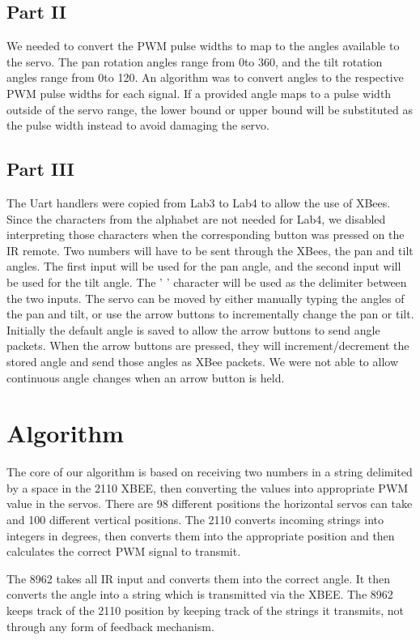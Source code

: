 \documentclass[11pt, titlepage]{article}
\begin{document}
        \subsection{Part II}
            We needed to convert the PWM pulse widths to map to the angles available to the servo. The pan rotation angles range from 0\degree to 360\degree, and the tilt rotation angles range from 0\degree to 120\degree. An algorithm was to convert angles to the respective PWM pulse widths for each signal. If a provided angle maps to a pulse width outside of the servo range, the lower bound or upper bound will be substituted as the pulse width instead to avoid damaging the servo.
        \subsection{Part III}
            The Uart handlers were copied from Lab3 to Lab4 to allow the use of XBees. Since the characters from the alphabet are not needed for Lab4, we disabled interpreting those characters when the corresponding button was pressed on the IR remote. Two numbers will have to be sent through the XBees, the pan and tilt angles. The first input will be used for the pan angle, and the second input will be used for the tilt angle. The ' ' character will be used as the delimiter between the two inputs. The servo can be moved by either manually typing the angles of the pan and tilt, or use the arrow buttons to incrementally change the pan or tilt. Initially the default angle is saved to allow the arrow buttons to send angle packets. When the arrow buttons are pressed, they will increment/decrement the stored angle and send those angles as XBee packets. We were not able to allow continuous angle changes when an arrow button is held.
    \section{Algorithm}
        The core of our algorithm is based on receiving two numbers in a string delimited by a space in the 2110 XBEE, then converting the values into appropriate PWM value in the servos.   There are 98 different positions the horizontal servos can take and 100 different vertical positions.  The 2110 converts incoming strings into integers in degrees, then converts them into the appropriate position and then calculates the correct PWM signal to transmit.

The 8962 takes all IR input and converts them into the correct angle.  It then converts the angle into a string which is transmitted via the XBEE.  The 8962 keeps track of the 2110 position by keeping track of the strings it transmits, not through any form of feedback mechanism.
\end{document}
